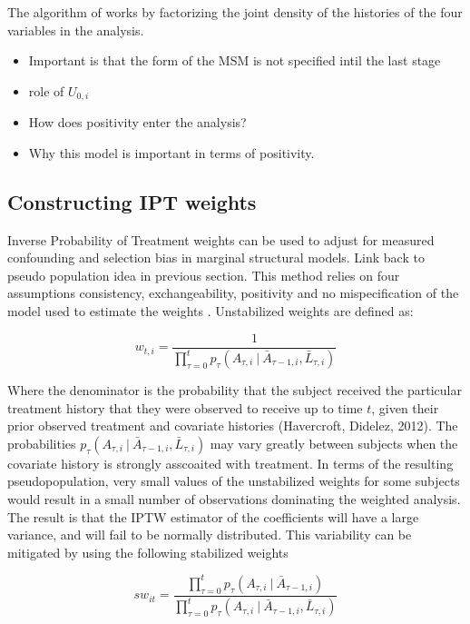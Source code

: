 \documentclass[11pt]{article}
\providecommand{\tightlist}{%
      \setlength{\itemsep}{0pt}\setlength{\parskip}{0pt}}
\begin{document}
The algorithm of \citet{Havercroft2012} works by factorizing the joint
density of the histories of the four variables in the analysis.

\begin{itemize}
\tightlist
\item
  Important is that the form of the MSM is not specified intil the last
  stage
\item
  role of \(U_{0, i}\)
\item
  How does positivity enter the analysis?
\item
  Why this model is important in terms of positivity.
\end{itemize}

\subsection{Constructing IPT weights}\label{constructing-ipt-weights}

Inverse Probability of Treatment weights can be used to adjust for
measured confounding and selection bias in marginal structural models.
Link back to pseudo population idea in previous section. This method
relies on four assumptions consistency, exchangeability, positivity and
no mispecification of the model used to estimate the weights
\citet{Cole2008}. Unstabilized weights are defined as:

\[w_{t,i} = \frac{1}{\prod_{\tau=0} ^ t p_{\tau} (A_{\tau, i}\ |\ \bar A_{\tau-1, i}, \bar L_{\tau, i})}\]

Where the denominator is the probability that the subject received the
particular treatment history that they were observed to receive up to
time \(t\), given their prior observed treatment and covariate histories
(Havercroft, Didelez, 2012). The probabilities
\(p_{\tau} (A_{\tau, i}\ |\ \bar A_{\tau-1, i}, \bar L_{\tau, i})\) may
vary greatly between subjects when the covariate history is strongly
asscoaited with treatment. In terms of the resulting pseudopopulation,
very small values of the unstabilized weights for some subjects would
result in a small number of observations dominating the weighted
analysis. The result is that the IPTW estimator of the coefficients will
have a large variance, and will fail to be normally distributed. This
variability can be mitigated by using the following stabilized weights

\[sw_{it} = \frac{\prod_{\tau=0} ^ t p_{\tau} (A_{\tau, i}\ |\ \bar A_{\tau-1, i})} {\prod_{\tau=0} ^ t p_{\tau} (A_{\tau, i}\ |\ \bar A_{\tau-1, i}, \bar L_{\tau, i})}\]
\end{document}
